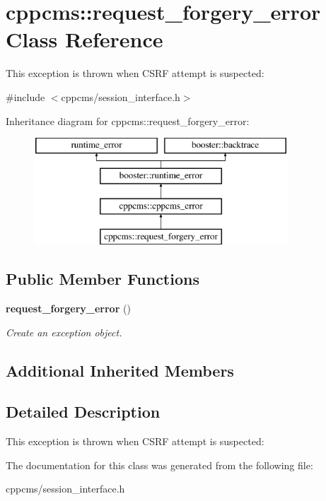 \section{cppcms\+:\+:request\+\_\+forgery\+\_\+error Class Reference}
\label{classcppcms_1_1request__forgery__error}


This exception is thrown when C\+S\+RF attempt is suspected\+:  




{\ttfamily \#include $<$cppcms/session\+\_\+interface.\+h$>$}

Inheritance diagram for cppcms\+:\+:request\+\_\+forgery\+\_\+error\+:\begin{figure}[H]
\begin{center}
\leavevmode
\includegraphics[height=4.000000cm]{classcppcms_1_1request__forgery__error}
\end{center}
\end{figure}
\subsection*{Public Member Functions}
\begin{DoxyCompactItemize}
\item 
{\bf request\+\_\+forgery\+\_\+error} ()\label{classcppcms_1_1request__forgery__error_aa9780eb84d19376a1f92e6db320eb902}

\begin{DoxyCompactList}\small\item\em Create an exception object. \end{DoxyCompactList}\end{DoxyCompactItemize}
\subsection*{Additional Inherited Members}


\subsection{Detailed Description}
This exception is thrown when C\+S\+RF attempt is suspected\+: 

The documentation for this class was generated from the following file\+:\begin{DoxyCompactItemize}
\item 
cppcms/session\+\_\+interface.\+h\end{DoxyCompactItemize}
